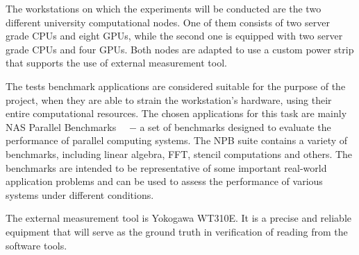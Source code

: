 The workstations on which the experiments will be conducted are
the two different university computational nodes. One of them
consists of two server grade CPUs and eight GPUs, while the second
one is equipped with two server grade CPUs and four GPUs. Both nodes
are adapted to use a custom power strip that supports the use
of external measurement tool.

The tests benchmark applications are considered suitable for the
purpose of the project, when they are able to strain the
workstation's hardware, using their entire computational resources.
The chosen applications for this task are mainly NAS Parallel
Benchmarks~\cite{NPB}~\cite{NASA_Advanced_Supercomputing} $-$ a set
of benchmarks designed to evaluate the performance of parallel
computing systems. The NPB suite contains a variety of
benchmarks, including linear algebra, FFT, stencil computations
and others. The benchmarks are intended to be representative of
some important real-world application problems and can be used
to assess the performance of various systems under different
conditions.

The external measurement tool is Yokogawa WT310E. It is a precise
and reliable equipment that will serve as the ground truth in
verification of reading from the software tools.

